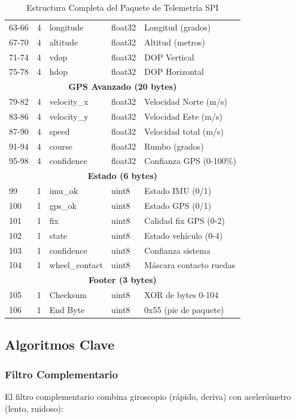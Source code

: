 \documentclass[11pt,a4paper]{article}
\begin{document}
\begin{table}[H]
\begin{tabular}{@{}llllp{5cm}@{}}
63-66 & 4 & longitude & float32 & Longitud (grados) \\
67-70 & 4 & altitude & float32 & Altitud (metros) \\
71-74 & 4 & vdop & float32 & DOP Vertical \\
75-78 & 4 & hdop & float32 & DOP Horizontal \\
\midrule
\multicolumn{5}{c}{\textbf{GPS Avanzado (20 bytes)}} \\
\midrule
79-82 & 4 & velocity\_x & float32 & Velocidad Norte (m/s) \\
83-86 & 4 & velocity\_y & float32 & Velocidad Este (m/s) \\
87-90 & 4 & speed & float32 & Velocidad total (m/s) \\
91-94 & 4 & course & float32 & Rumbo (grados) \\
95-98 & 4 & confidence & float32 & Confianza GPS (0-100\%) \\
\midrule
\multicolumn{5}{c}{\textbf{Estado (6 bytes)}} \\
\midrule
99 & 1 & imu\_ok & uint8 & Estado IMU (0/1) \\
100 & 1 & gps\_ok & uint8 & Estado GPS (0/1) \\
101 & 1 & fix & uint8 & Calidad fix GPS (0-2) \\
102 & 1 & state & uint8 & Estado vehículo (0-4) \\
103 & 1 & confidence & uint8 & Confianza sistema \\
104 & 1 & wheel\_contact & uint8 & Máscara contacto ruedas \\
\midrule
\multicolumn{5}{c}{\textbf{Footer (3 bytes)}} \\
\midrule
105 & 1 & Checksum & uint8 & XOR de bytes 0-104 \\
106 & 1 & End Byte & uint8 & 0x55 (pie de paquete) \\
\bottomrule
\end{tabular}
\caption{Estructura Completa del Paquete de Telemetría SPI}
\end{table}

\subsection{Algoritmos Clave}

\subsubsection{Filtro Complementario}

El filtro complementario combina giroscopio (rápido, deriva) con acelerómetro (lento, ruidoso):
\end{document}
